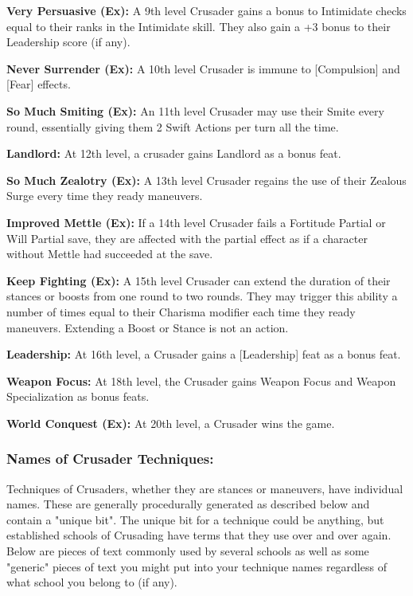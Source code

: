 \textbf{Very Persuasive (Ex):} A 9th level Crusader gains a bonus to Intimidate checks equal to their ranks in the Intimidate skill. They also gain a +3 bonus to their Leadership score (if any).

\textbf{Never Surrender (Ex):} A 10th level Crusader is immune to [Compulsion] and [Fear] effects.

\textbf{So Much Smiting (Ex):} An 11th level Crusader may use their Smite every round, essentially giving them 2 Swift Actions per turn all the time.

\textbf{Landlord:} At 12th level, a crusader gains Landlord as a bonus feat.

\textbf{So Much Zealotry (Ex):} A 13th level Crusader regains the use of their Zealous Surge every time they ready maneuvers.

\textbf{Improved Mettle (Ex):} If a 14th level Crusader fails a Fortitude Partial or Will Partial save, they are affected with the partial effect as if a character without Mettle had succeeded at the save.

\textbf{Keep Fighting (Ex):} A 15th level Crusader can extend the duration of their stances or boosts from one round to two rounds. They may trigger this ability a number of times equal to their Charisma modifier each time they ready maneuvers. Extending a Boost or Stance is not an action.

\textbf{Leadership:} At 16th level, a Crusader gains a [Leadership] feat as a bonus feat.

\textbf{Weapon Focus:} At 18th level, the Crusader gains Weapon Focus and Weapon Specialization as bonus feats.

\textbf{World Conquest (Ex):} At 20th level, a Crusader wins the game.

\subsubsection{Names of Crusader Techniques:}

Techniques of Crusaders, whether they are stances or maneuvers, have individual names. These are generally procedurally generated as described below and contain a "unique bit". The unique bit for a technique could be anything, but established schools of Crusading have terms that they use over and over again. Below are pieces of text commonly used by several schools as well as some "generic" pieces of text you might put into your technique names regardless of what school you belong to (if any).

